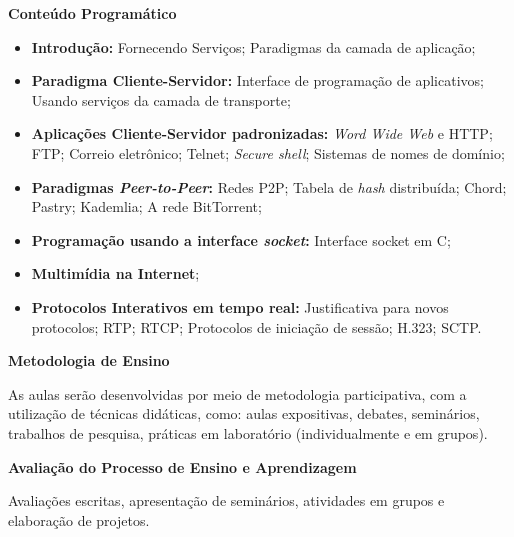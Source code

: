 
\begin{snugshade}\begin{center}\textbf{
    Conteúdo Programático
}\end{center}\end{snugshade}

\begin{itemize}

 \item \textbf{Introdução:} Fornecendo Serviços; Paradigmas da camada de aplicação;
 \item \textbf{Paradigma Cliente-Servidor:} Interface de programação de aplicativos; Usando serviços da camada de transporte;
 \item \textbf{Aplicações Cliente-Servidor padronizadas:} \textit{Word Wide Web} e HTTP; FTP; Correio eletrônico; Telnet; \textit{Secure shell}; Sistemas de nomes de domínio;
 \item \textbf{Paradigmas \textit{Peer-to-Peer}:} Redes P2P; Tabela de \textit{hash} distribuída; Chord; Pastry; Kademlia; A rede BitTorrent;
 \item \textbf{Programação usando a interface \textit{socket}:} Interface socket em C;
 \item \textbf{Multimídia na Internet};
 \item \textbf{Protocolos Interativos em tempo real:} Justificativa para novos protocolos; RTP; RTCP; Protocolos de iniciação de sessão; H.323; SCTP.
 
\end{itemize}

\begin{snugshade}\begin{center}\textbf{
    Metodologia de Ensino
}\end{center}\end{snugshade}

\noindent
   As aulas serão desenvolvidas por meio de metodologia participativa, com a utilização de técnicas didáticas, como: aulas expositivas, debates, seminários, trabalhos de pesquisa, práticas em laboratório (individualmente e em grupos).

\begin{snugshade}\begin{center}\textbf{
    Avaliação do Processo de Ensino e Aprendizagem
}\end{center}\end{snugshade}

\noindent
  Avaliações escritas, apresentação de seminários, atividades em grupos e elaboração de projetos.
   
